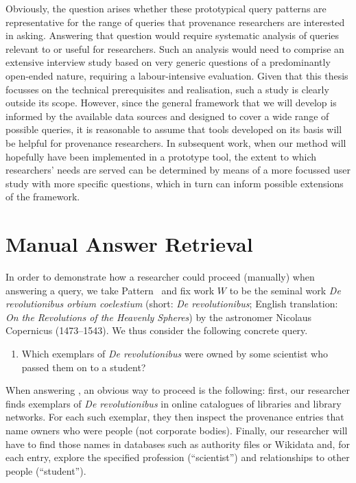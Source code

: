 Obviously, the question arises whether these prototypical query patterns are representative
for the range of queries that provenance researchers are interested in asking.
Answering that question would require systematic analysis of queries relevant to or useful for researchers.
Such an analysis would need to comprise an extensive interview study
based on very generic questions of a predominantly open-ended nature,
requiring a labour-intensive evaluation.
Given that this thesis focusses on the technical prerequisites and realisation,
such a study is clearly outside its scope. However, since the general framework that we will develop
is informed by the available data sources
and designed to cover a wide range of possible queries,
it is reasonable to assume that tools developed on its basis will be helpful for provenance researchers.
In subsequent work, when our method will hopefully have been implemented in a prototype tool,
the extent to which researchers' needs are served can be determined by means of a more focussed user study
with more specific questions, which in turn can inform possible extensions of the framework.

\section{Manual Answer Retrieval}
\label{sec:manual_answering}

In order to demonstrate how a researcher could proceed (manually) when answering a query,
we take Pattern~ and fix work $W$ to be the seminal work \emph{De revolutionibus orbium coelestium}
(short: \emph{De revolutionibus}; English translation: \emph{On the Revolutions of the Heavenly Spheres}) \autocite{Kopernikus1543}
by the astronomer Nicolaus Copernicus (1473–1543).
We thus consider the following concrete query.
%
\begin{enumerate}
  \item[\exaquery{2$'$}]
    Which exemplars of \emph{De revolutionibus} were owned by some scientist who passed them on to a student?
\end{enumerate}
%
When answering , an obvious way to proceed is the following:
first, our researcher finds exemplars of \emph{De revolutionibus} 
in online catalogues of libraries and library networks. For each such exemplar, they then inspect the provenance entries
that name owners who were people (not corporate bodies). Finally, our researcher will have to find those names in databases such as
authority files or Wikidata and, for each entry, explore the specified profession (\enquote{scientist})
and relationships to other people (\enquote{student}).


